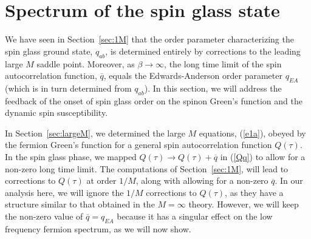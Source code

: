\documentclass[aps,prx,preprint,onecolumn,citeautoscript,superscriptaddress,nofootinbib,
eqsecnum]{revtex4}
\begin{document}
{\section{Spectrum of the spin glass state}
\label{sec:spectrum}

We have seen in Section~\ref{sec:1M} that the order parameter characterizing the spin glass ground state, $q_{ab}$, is determined entirely by corrections to the leading large $M$ saddle point. Moreover, as $\beta \rightarrow \infty$, the long time limit of the spin autocorrelation function, $\overline{q}$, equals the Edwards-Anderson order parameter $q_{EA}$ (which is in turn determined from $q_{ab}$). In this section, we will address the feedback of the onset of spin glass order on the spinon Green's function and the dynamic spin susceptibility.

In Section~\ref{sec:largeM}, we determined the large $M$ equations, (\ref{e1a}), obeyed by the fermion Green's function for a general spin autocorrelation function $Q (\tau)$. In the spin glass phase, we mapped $Q (\tau) \rightarrow Q(\tau) + \overline{q}$ in (\ref{Qq}) to allow for a non-zero long time limit. The computations of Section~\ref{sec:1M}, will lead to corrections to $Q(\tau)$ at order $1/M$, along with allowing for a non-zero $\overline{q}$. In our analysis here, we will ignore the $1/M$ corrections to $Q(\tau)$, as they have a structure similar to that obtained in the $M = \infty$ theory. However, we will keep the non-zero value of $\overline{q} = q_{EA}$ because it has a singular effect on the low frequency fermion spectrum, as we will now show.

}
\end{document}
